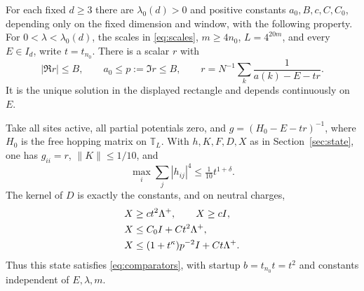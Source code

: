 \begin{proposition}[Initialization]\label{prop:initialization}
For each fixed $d\ge3$ there are $\lambda_0(d)>0$ and positive
constants $a_0,B,c,C,C_0$, depending only on the fixed dimension and
window, with the following
property.  For
$0<\lambda<\lambda_0(d)$, the scales in \eqref{eq:scales},
$m\ge4n_0$, $L=4^{20m}$, and every $E\in I_d$,
write $t=t_{n_0}$.  There is a scalar $r$ with
\[
 |\Re r|\le B,\qquad a_0\le p:=\Im r\le B,
 \qquad
 r=N^{-1}\sum_k\frac1{a(k)-E-tr}.
\]
It is the unique solution in the displayed rectangle and depends
continuously on $E$.

Take all sites active, all partial potentials zero, and
$g=(H_0-E-tr)^{-1}$, where $H_0$ is the free hopping matrix on
$\mathbb T_L$.  With $h,K,F,D,X$ as in
Section~\ref{sec:state}, one has $g_{ii}=r$, $\|K\|\le1/10$, and
\[
 \max_i\sum_j|h_{ij}|^4\le\tfrac1{10}t^{1+\delta}.
\]
The kernel of $D$ is exactly the constants, and on neutral charges,
\begin{equation}\label{eq:initial-comparisons}
 \begin{split}
 X&\ge ct^2\Lambda^+,\qquad X\ge cI,\\
 X&\le C_0I+Ct^2\Lambda^+,\\
 X&\le(1+t^\kappa)p^{-2}I+Ct\Lambda^+.
 \end{split}
\end{equation}
Thus this state satisfies \eqref{eq:comparators}, with startup
$b=t_{n_0}t=t^2$ and constants independent of $E,\lambda,m$.
\end{proposition}


